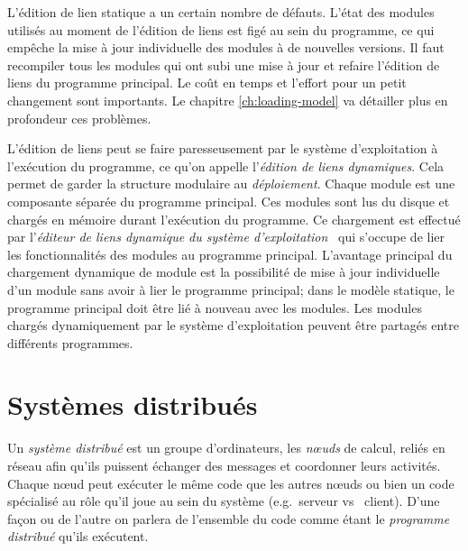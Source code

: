 L'édition de lien statique a un certain nombre de défauts. L'état des
modules utilisés au moment de l'édition de liens est figé au sein du
programme, ce qui empêche la mise à jour individuelle des modules à de nouvelles versions. Il faut
recompiler tous les modules qui ont subi une mise à jour et refaire l'édition de liens du
programme principal. Le coût en temps et l'effort pour un petit changement
sont importants.  Le chapitre \ref{ch:loading-model} va détailler plus en profondeur
ces problèmes.

L'édition de liens peut se faire paresseusement par le système d'exploitation à
l'exécution du programme, ce qu'on appelle l'\textit{édition de liens
dynamiques}.  Cela permet de garder la structure modulaire au
\textit{déploiement}.  Chaque module est une composante séparée du programme
principal.  Ces modules sont lus du disque et chargés en mémoire durant
l'exécution du programme.  Ce chargement est effectué par l'\textit{éditeur de
liens dynamique du système d'exploitation}~\cite{DBLP:journals/cse/BeazleyWC01,DBLP:journals/spe/HoO91}
qui s'occupe de lier les fonctionnalités des modules au programme principal.
L'avantage principal du chargement dynamique de module est la
possibilité de mise à jour individuelle d'un module sans avoir à lier le
programme principal; dans le modèle statique, le programme principal doit être
lié à nouveau avec les modules.  Les modules chargés dynamiquement par le
système d'exploitation peuvent être partagés entre différents programmes.

\section{Systèmes distribués}

Un \textit{système distribué} est un groupe d'ordinateurs, les
\textit{nœuds} de calcul, reliés en réseau afin qu'ils puissent
échanger des messages et coordonner leurs activités.  Chaque nœud peut
exécuter le même code que les autres nœuds ou bien un code spécialisé
au rôle qu'il joue au sein du système (e.g.~serveur vs ~client).
D'une façon ou de l'autre on parlera de l'ensemble du code comme étant
le \textit{programme distribué} qu'ils exécutent.

